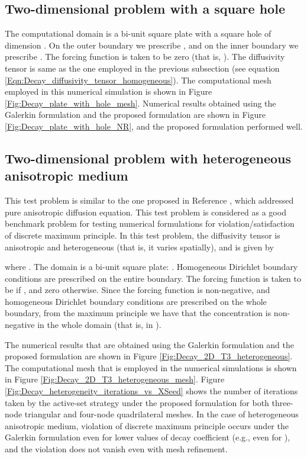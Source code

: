 \documentclass[11pt]{amsart}
\begin{document}
\subsection{Two-dimensional problem with a square hole}
The computational domain is a bi-unit square plate  with a square 
hole of dimension . On the outer boundary we prescribe , and on the inner boundary we prescribe . The forcing function is taken to be zero (that is, ). The 
diffusivity tensor is same as the one employed in the previous subsection (see equation 
\eqref{Eqn:Decay_diffusivity_tensor_homogeneous}). The computational mesh employed in this 
numerical simulation is shown in Figure \ref{Fig:Decay_plate_with_hole_mesh}. Numerical results 
obtained using the Galerkin formulation and the proposed formulation are shown in Figure 
\ref{Fig:Decay_plate_with_hole_NR}, and the proposed formulation performed well.

\subsection{Two-dimensional problem with heterogeneous anisotropic medium}
This test problem is similar to the one proposed in Reference \cite{LePotier_CRM_2005_v341_p787}, 
which addressed pure anisotropic diffusion equation. This test problem is considered as 
a good benchmark problem for testing numerical formulations for violation/satisfaction 
of discrete maximum principle. In this test problem, the diffusivity tensor is anisotropic 
and heterogeneous (that is, it varies spatially), and is given by

where . The domain is a bi-unit square plate: . 
Homogeneous Dirichlet boundary conditions are prescribed on the entire boundary. The forcing 
function is taken to be  if , and zero otherwise. Since the forcing function is non-negative, 
and homogeneous Dirichlet boundary conditions are prescribed on the whole boundary, from the 
maximum principle we have that the concentration is non-negative in the whole domain (that is, 
 in ). 

The numerical results that are obtained using the Galerkin formulation and the proposed formulation 
are shown in Figure \ref{Fig:Decay_2D_T3_heterogeneous}. The computational mesh that is employed in 
the numerical simulations is shown in Figure \ref{Fig:Decay_2D_T3_heterogeneous_mesh}. Figure 
\ref{Fig:Decay_heterogeneity_iterations_vs_XSeed} shows the number of iterations taken by the 
active-set strategy under the proposed formulation for both three-node triangular and four-node 
quadrilateral meshes. In the case of heterogeneous anisotropic medium, violation of discrete 
maximum principle occurs under the Galerkin formulation even for lower values of decay coefficient 
(e.g., even for ), and the violation does not vanish even with mesh refinement.
\end{document}
